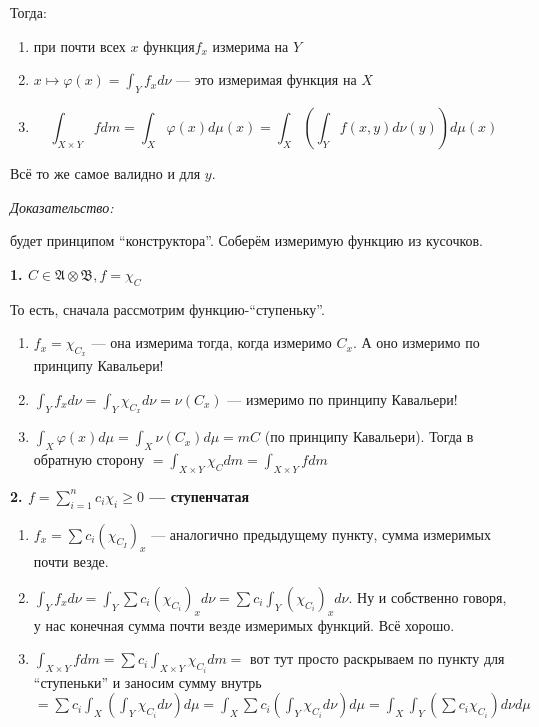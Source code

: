 \documentclass{article}
\begin{document}
Тогда:

\begin{enumerate}
    \item при почти всех $x$ функция$f_{x}$ измерима на $Y$
    \item $x \mapsto \varphi(x) = \int_{Y} f_{x} d\nu$ --- это измеримая функция на $X$
    \item \[\int_{X \times Y} f dm= \int_{X} \varphi(x) d \mu(x) = \int_{X} \left( \int_{Y} f(x, y) d  \nu (y)\right) d \mu(x)\]
\end{enumerate}

Всё то же самое валидно и для $y$.

\textit{Доказательство:}

будет принципом ``конструктора''. Соберём измеримую функцию из кусочков.

\textbf{1. $C \in \mathfrak{A} \otimes \mathfrak{B}, f = \chi_C$}

То есть, сначала рассмотрим функцию-``ступеньку''. 

\begin{enumerate}
    \item $f_x = \chi_{C_x}$ --- она измерима тогда, когда измеримо $C_x$. А оно измеримо по принципу Кавальери!
    \item $\int_{Y} f_x d\nu = \int_{Y} \chi_{C_x} d\nu = \nu(C_x)$ --- измеримо по принципу Кавальери!
    \item $\int_{X} \varphi(x) d\mu = \int_{X} \nu(C_x) d\mu = mC$ (по принципу Кавальери). Тогда в обратную сторону $= \int_{X \times Y} \chi_{C} dm = \int_{X \times Y} f dm$
\end{enumerate}

\textbf{2. $f = \sum_{i = 1}^{n} c_i \chi_i \ge 0$ --- ступенчатая}

\begin{enumerate}
    \item $f_x = \sum c_i (\chi_{C_I})_x$ --- аналогично предыдущему пункту, сумма измеримых почти везде.
    \item $\int_{Y} f_x d\nu = \int_{Y} \sum c_i (\chi_{C_i})_x d\nu = \sum c_i \int_{Y} (\chi_{C_i})_x d\nu$. Ну и собственно говоря, у нас конечная сумма почти везде измеримых функций. Всё хорошо.
    \item $\int_{X \times Y} f dm = \sum c_i \int_{X \times Y} \chi_{C_i} dm=$ вот тут просто раскрываем по пункту для ``ступеньки'' и заносим сумму внутрь $=\sum c_i \int_{X} \left(\int_{Y} \chi_{C_i} d\nu\right) d\mu = \int_{X} \sum c_i \left( \int_{Y} \chi_{C_i} d\nu \right) d\mu = \int_{X} \int_{Y} \left( \sum c_i \chi_{C_i}\right) d\nu d\mu$
\end{enumerate}
\end{document}
